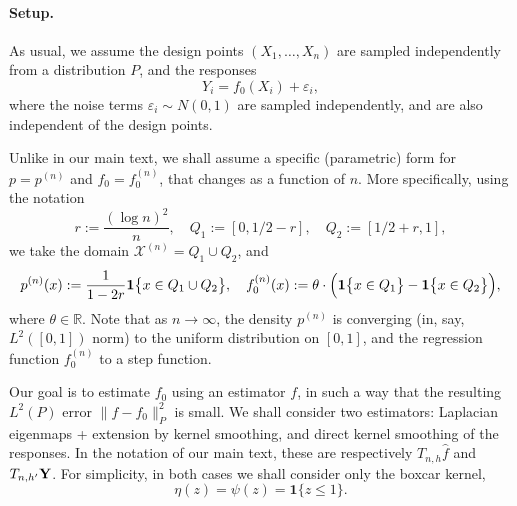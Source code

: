 \documentclass[aos]{imsart}
\theoremstyle{plain}
\theoremstyle{definition}
\theoremstyle{remark}
\def\R{\mathbb{R}}
\newcommand{\wh}[1]{\widehat{#1}}
\newcommand{\mc}[1]{\mathcal{#1}}
\newcommand{\Reals}{\mathbb{R}} %
\newcommand{\1}{\mathbf{1}}
\begin{document}
\paragraph{Setup.}
As usual, we assume the design points $(X_1,\ldots,X_n)$ are sampled independently from a distribution $P$, and the responses
\begin{equation*}
Y_i = f_0(X_i) + \varepsilon_i,
\end{equation*}
where the noise terms $\varepsilon_i \sim N(0,1)$ are sampled independently, and are also independent of the design points.

Unlike in our main text, we shall assume a specific (parametric) form for $p = p^{(n)}$ and $f_0 = f_0^{(n)}$, that changes as a function of $n$. More specifically, using the notation
\begin{equation*}
r := \frac{(\log n)^2}{n}, \quad Q_1 := [0,1/2 - r], \quad Q_2 := [1/2 + r,1],
\end{equation*}
we take the domain $\mc{X}^{(n)} = Q_1 \cup Q_2$, and 
\begin{equation}
\label{def:model_cluster_assumption}
p^{(n)}(x) := \frac{1}{1 - 2r}\1\bigl\{x \in Q_1 \cup Q_2\bigr\}, \quad f_0^{(n)}(x) := \theta \cdot \Bigl(\1\bigl\{x \in Q_1\bigr\} - \1\bigl\{x \in Q_2\bigr\}\Bigr),
\end{equation}
where $\theta \in \Reals$. Note that as $n \to \infty$, the density $p^{(n)}$ is converging (in, say, $L^2([0,1])$ norm) to the uniform distribution on $[0,1]$, and the regression function $f_0^{(n)}$ to a step function. 

Our goal is to estimate $f_0$ using an estimator $f$, in such a way that the resulting $L^2(P)$ error $\|f - f_0\|_P^2$ is small. We shall consider two estimators: Laplacian eigenmaps + extension by kernel smoothing, and direct kernel smoothing of the responses. In the notation of our main text, these are respectively $T_{n,h}\wh{f}$ and $T_{n,h'}{\bf Y}$. For simplicity, in both cases we shall consider only the boxcar kernel,
\begin{equation}
\label{asmp:boxcar_kernel}
\eta(z) = \psi(z) = \1\{z \leq 1\}.
\end{equation}
\end{document}

